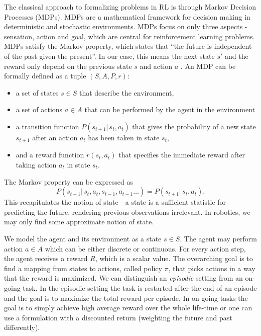 The classical approach to formalizing problems in RL is through
Markov Decision Processes (MDPs).
MDPs are a mathematical
framework for decision making in deterministic and stochastic environments.
MDPs focus on only three aspects
- sensation, action and goal, which are central
for reinforcement learning problems.
MDPs satisfy the Markov property, which
states that ``the future is independent
of the past given the present''. In our case, this means
the next state $s'$ and the reward
only depend on the previous state $s$ and
action $a$ \citep{sutton1992reinforcement}.
An MDP can be formally defined as a tuple $(S, A, P, r)$:

\begin{itemize}
\item a set of states $s \in S$ that describe the environment,
\item a set of actions $a \in A$ that can be performed by the agent in
  the environment
\item a transition function $P(s_{t+1} |\, s_t, a_t)$ that
  gives the probability of a new
  state $s_{t+1}$ after an action $a_t$ has been taken in state $s_t$,
\item and a reward function $r(s_t, a_t)$ that specifies
  the immediate reward after taking action
  $a_t$ in state $s_t$.
\end{itemize}

The Markov property can be expressed as
$$ P(s_{t+1} |\, s_t, a_t, s_{t-1}, a_{t-1}\dots) = P(s_{t+1} |\, s_t, a_t). $$
This recapitulates the notion of state - a state is a sufficient statistic
for predicting the future, rendering previous observations irrelevant.
In robotics, we may only find some approximate notion of state.

We model the agent and its environment as a state $s \in S$.
The agent may perform action $ a \in A$ which can be
either discrete or continuous.
For every action step, the agent receives a reward $R$,
which is a scalar value.
The overarching goal is to find a mapping from states to actions,
called policy $\pi$, that picks actions in a way that
the reward is maximized.
We can distinguish an \textit{episodic} setting
from an on-going task.
In the episodic setting
the task is restarted after
the end of an episode and the goal is
to maximize the total reward per episode.
In on-going tasks the goal
is to simply achieve high average reward over
the whole life-time or one can use a formulation
with a discounted return (weighting the
future and past differently).


